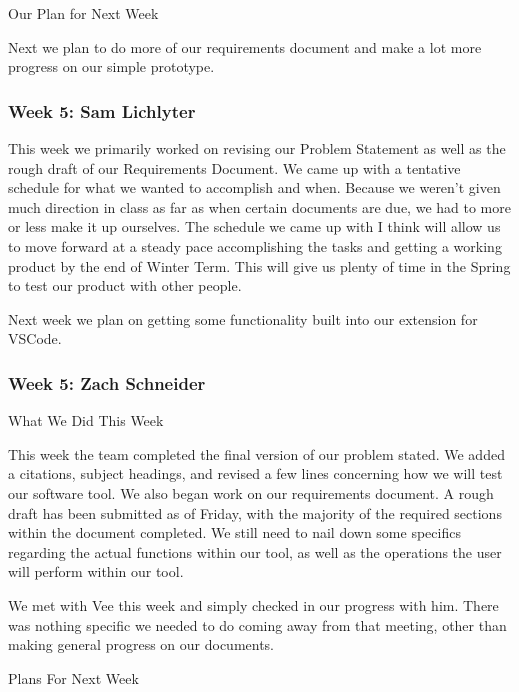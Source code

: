 Our Plan for Next Week



Next we plan to do more of our requirements document and make a lot more progress on our simple prototype.  \\ 

 \subsubsection{Week 5: Sam Lichlyter}

This week we primarily worked on revising our Problem Statement as well as the rough draft of our Requirements Document. We came up with a tentative schedule for what we wanted to accomplish and when. Because we weren't given much direction in class as far as when certain documents are due, we had to more or less make it up ourselves. The schedule we came up with I think will allow us to move forward at a steady pace accomplishing the tasks and getting a working product by the end of Winter Term. This will give us plenty of time in the Spring to test our product with other people.



Next week we plan on getting some functionality built into our extension for VSCode. \\ 

 \subsubsection{Week 5: Zach Schneider}

What We Did This Week

This week the team completed the final version of our problem stated. We added a citations, subject headings, and revised a few lines concerning how we will test our software tool. We also began work on our requirements document. A rough draft has been submitted as of Friday, with the majority of the required sections within the document completed. We still need to nail down some specifics regarding the actual functions within our tool, as well as the operations the user will perform within our tool. 



We met with Vee this week and simply checked in our progress with him. There was nothing specific we needed to do coming away from that meeting, other than making general progress on our documents.



Plans For Next Week

